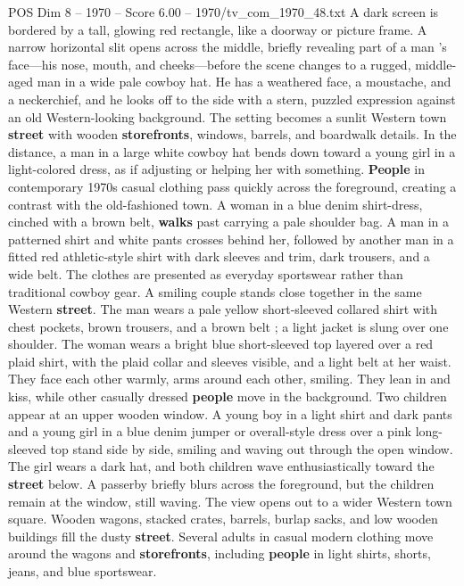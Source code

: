 \begin{textsample}{POS Dim 8 – 1970 – Score 6.00 – 1970/tv\_com\_1970\_48.txt}  \label{ex:f8_pos_037}
A dark screen is bordered by a tall, glowing red rectangle, like a doorway or picture frame.
A narrow horizontal slit opens across the middle, briefly revealing part of a man ’s face—his nose, mouth, and cheeks—before the scene changes to a rugged, middle-aged man in a wide pale cowboy hat.
He has a weathered face, a moustache, and a neckerchief, and he looks off to the side with a stern, puzzled expression against an old Western-looking background.
The setting becomes a sunlit Western town \textbf{street} with wooden \textbf{storefronts}, windows, barrels, and boardwalk details.
In the distance, a man in a large white cowboy hat bends down toward a young girl in a light-colored dress, as if adjusting or helping her with something. \textbf{People} in contemporary 1970s casual clothing pass quickly across the foreground, creating a contrast with the old-fashioned town.
A woman in a blue denim shirt-dress, cinched with a brown belt, \textbf{walks} past carrying a pale shoulder bag.
A man in a patterned shirt and white pants crosses behind her, followed by another man in a fitted red athletic-style shirt with dark sleeves and trim, dark trousers, and a wide belt.
The clothes are presented as everyday sportswear rather than traditional cowboy gear.
A smiling couple stands close together in the same Western \textbf{street}.
The man wears a pale yellow short-sleeved collared shirt with chest pockets, brown trousers, and a brown belt ; a light jacket is slung over one shoulder.
The woman wears a bright blue short-sleeved top layered over a red plaid shirt, with the plaid collar and sleeves visible, and a light belt at her waist.
They face each other warmly, arms around each other, smiling.
They lean in and kiss, while other casually dressed \textbf{people} move in the background.
Two children appear at an upper wooden window.
A young boy in a light shirt and dark pants and a young girl in a blue denim jumper or overall-style dress over a pink long-sleeved top stand side by side, smiling and waving out through the open window.
The girl wears a dark hat, and both children wave enthusiastically toward the \textbf{street} below.
A passerby briefly blurs across the foreground, but the children remain at the window, still waving.
The view opens out to a wider Western town square.
Wooden wagons, stacked crates, barrels, burlap sacks, and low wooden buildings fill the dusty \textbf{street}.
Several adults in casual modern clothing move around the wagons and \textbf{storefronts}, including \textbf{people} in light shirts, shorts, jeans, and blue sportswear.

\end{textsample}
